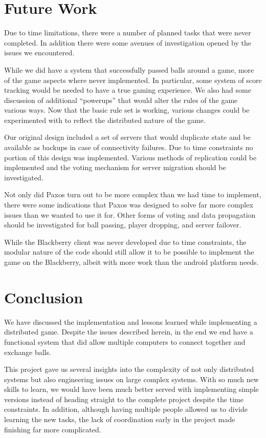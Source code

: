 \documentclass{sig-alternate}
\begin{document}
\section{Future Work}
\label{future}

Due to time limitations, there were a number of planned tasks that were
never completed.  In addition there were some avenues of investigation
opened by the issues we encountered.

While we did have a system that successfully passed balls around a game,
more of the game aspects where never implemented.  In particular, some
system of score tracking would be needed to have a true gaming experience.
We also had some discussion of additional ``powerups'' that would alter the
rules of the game various ways.  Now that the basic rule set is working,
various changes could be experimented with to reflect the distributed
nature of the game.

Our original design included a set of servers that would duplicate state
and be available as backups in case of connectivity failures.  Due to time
constraints no portion of this design was implemented.  Various methods of
replication could be implemented and the voting mechanism for server
migration should be investigated.

Not only did Paxos turn out to be more complex than we had time to
implement, there were some indications that Paxos was designed to solve far
more complex issues than we wanted to use it for.  Other forms of voting
and data propagation should be investigated for ball passing, player
dropping, and server failover.

While the Blackberry client was never developed due to time constraints,
the modular nature of the code should still allow it to be possible to
implement the game on the Blackberry, albeit with more work than the
android platform needs.

\section{Conclusion}

We have discussed the implementation and lessons learned while implementing
a distributed game.  Despite the issues described herein, in the end we end
have a functional system that did allow multiple computers to connect
together and exchange balls.

This project gave us several insights into the complexity of not only
distributed systems but also engineering issues on large complex systems.
With so much new skills to learn, we would have been much better served
with implementing simple versions instead of heading straight to the
complete project despite the time constraints.  In addition, although
having multiple people allowed us to divide learning the new tasks, the
lack of coordination early in the project made finishing far more
complicated.



\balance
\end{document}
